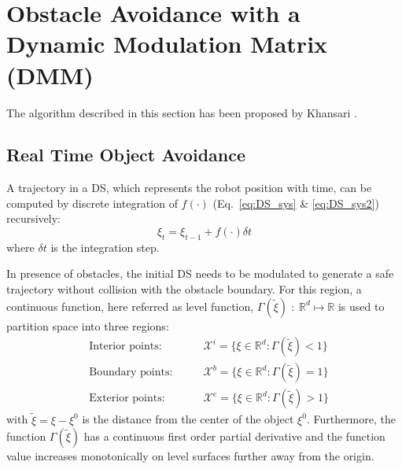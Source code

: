 \section{Obstacle Avoidance with a Dynamic Modulation Matrix (DMM) } \label{sec:DMM}
The algorithm described in this section has been proposed by Khansari \cite{khansari2012dynamical}.

\subsection{Real Time Object Avoidance}
A trajectory in a DS, which represents the robot position with time, can be computed by discrete integration of $f(\cdot)$ (Eq.~\ref{eq:DS_sys} \& \ref{eq:DS_sys2}) recursively:
\begin{equation}
  \xi_{t} = \xi_{t-1} + f(\cdot) \delta t
\end{equation}
where $\delta t$ is the integration step.

In presence of obstacles, the initial DS needs to be modulated to generate a safe trajectory without collision with the obstacle boundary. For this region, a continuous function, here referred as level function, $\Gamma(\tilde \xi) \; : \;\mathbb{R}^d \mapsto \mathbb{R}$ is used to partition space into three regions:
\begin{align}
  &\text{Interior points:}  \qquad & \mathcal{X}^i = \{\xi \in \mathbb{R}^d: \Gamma(\tilde \xi) < 1 \} \\
  &\text{Boundary points:}  \qquad & \mathcal{X}^b = \{\xi \in \mathbb{R}^d: \Gamma(\tilde \xi) = 1 \} \\
  &\text{Exterior points:}  \qquad & \mathcal{X}^e = \{\xi \in \mathbb{R}^d: \Gamma(\tilde \xi) > 1 \}
\end{align}
with $\tilde \xi = \xi - \xi^0$ is the distance from the center of the object $\xi^0$. Furthermore, the function $\Gamma (\tilde \xi)$ has a continuous first order partial derivative and the function value increases monotonically on level surfaces further away from the origin.


